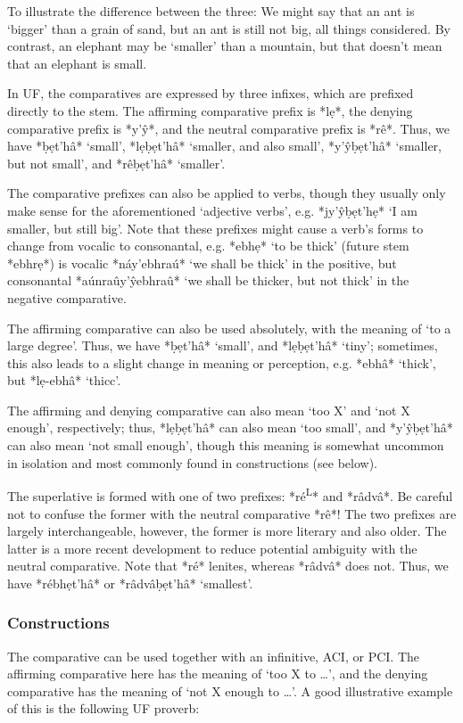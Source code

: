 \documentclass[a4paper, 12pt, oneside, final]{article}
\def \L {\textsuperscript{L}}
\begin{document}
To illustrate the difference between the three: We might say that an ant is ‘bigger’ than a grain of sand, but
an ant is still not big, all things considered. By contrast, an elephant may be ‘smaller’ than a mountain,
but that doesn’t mean that an elephant is small.

In UF, the comparatives are expressed by three infixes, which are prefixed directly to the stem. The affirming
comparative prefix is *lẹ*, the denying comparative prefix is *y’ŷ*, and the neutral comparative prefix is *rê*.
Thus, we have *ḅẹt’hâ* ‘small’, *lẹḅẹt’hâ* ‘smaller, and also small’, *y’ŷḅẹt’hâ* ‘smaller, but not small’, and
*rêḅẹt’hâ* ‘smaller’.

The comparative prefixes can also be applied to verbs, though they usually only make sense for the aforementioned
‘adjective verbs’, e.g. *jy’ŷḅẹt’hẹ* ‘I am smaller, but still big’. Note that these prefixes
might cause a verb’s forms to change from vocalic to consonantal, e.g. *ebhẹ* ‘to be thick’ (future stem *ebhrẹ*)
is vocalic *náy’ebhraú* ‘we shall be thick’ in the positive, but consonantal *aúnraûy’ŷebhraû* ‘we shall be
thicker, but not thick’ in the negative comparative.

The affirming comparative can also be used absolutely, with the meaning of ‘to a large degree’. Thus,
we have *ḅẹt’hâ* ‘small’, and *lẹḅẹt’hâ* ‘tiny’; sometimes, this also leads to a slight change in meaning
or perception, e.g. *ebhâ* ‘thick’, but *lẹ-ebhâ* ‘thicc’.

The affirming and denying comparative can also mean ‘too X’ and ‘not X enough’, respectively; thus, *lẹḅẹt’hâ*
can also mean ‘too small’, and *y’ŷḅẹt’hâ* can also mean ‘not small enough’, though this meaning is somewhat
uncommon in isolation and most commonly found in constructions (see below).

The superlative is formed with one of two prefixes: *ré\L* and *râdvâ*. Be careful not to confuse the former
with the neutral comparative *rê*! The two prefixes are largely interchangeable, however, the former is more
literary and also older. The latter is a more recent development to reduce potential ambiguity with the
neutral comparative. Note that *ré* lenites, whereas *râdvâ* does not. Thus, we have *rébhẹt’hâ* or
*râdvâḅẹt’hâ* ‘smallest’.

\subsubsection{Constructions}
The comparative can be used together with an infinitive, ACI, or PCI. The affirming comparative here has the meaning
of ‘too X to \ldots’, and the denying comparative has the meaning of ‘not X enough to \ldots’. A good illustrative
example of this is the following UF proverb:
\end{document}
